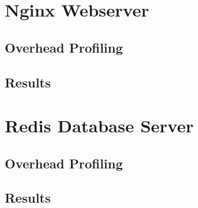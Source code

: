\section{Nginx Webserver}
\subsection{Overhead Profiling}
\subsection{Results}

\section{Redis Database Server}
\subsection{Overhead Profiling}
\subsection{Results}